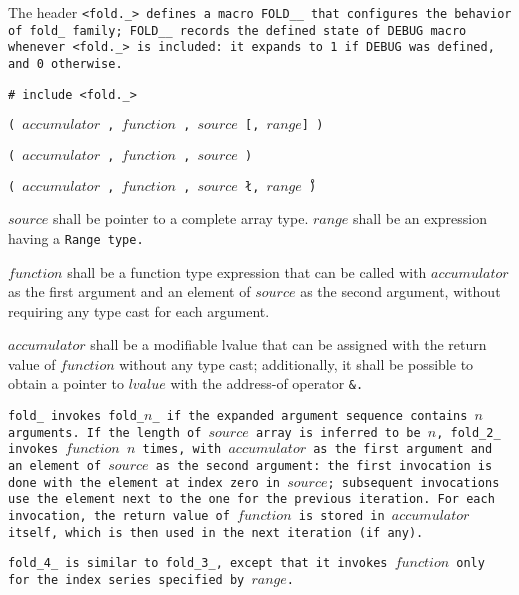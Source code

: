 The header \tt{<fold._>} defines a macro \tt{FOLD__} that configures
the behavior of \tt{fold_} family; \tt{FOLD__} records the \tt{defined}
state of \tt{DEBUG} macro whenever \tt{<fold._>} is included:
it expands to \tt{1} if \tt{DEBUG} was defined, and \tt{0} otherwise.


\tt{# include <fold._>}

\s\s\s\tt{(} $accumulator$ \tt{,}
$function$ \tt{,} $source$ [\tt{,} $range$] \tt{)}

\s\tt{(} $accumulator$ \tt{,}
$function$ \tt{,} $source$ \tt{)}

\s\tt{(} $accumulator$ \tt{,}
$function$ \tt{,} $source$ \l\tt{,} $range$\r\ \tt{)}


$source$ shall be pointer to a complete array type.
$range$  shall be an expression having a \tt{Range} type.

$function$ shall be a function type expression that can be called with
$accumulator$ as the first argument and an element of $source$ as the
second argument, without requiring any type cast for each argument.

$accumulator$ shall be a modifiable lvalue that can be assigned with the
return value of $function$ without any type cast; additionally, it shall be
possible to obtain a pointer to $lvalue$ with the address-of operator \tt{&}.

\enlargethispage*{\baselineskip}


\tt{fold_} invokes \tt{fold_}$n$\_ if the
expanded argument sequence contains $n$ arguments.
If the length of $source$ array is inferred to be $n$, \tt{fold_2_}
invokes $function$ $n$ times, with $accumulator$ as the first argument
and an element of $source$ as the second argument: the first invocation
is done with the element at index zero in $source$; subsequent
invocations use the element next to the one for the previous iteration.
For each invocation, the return value of $function$ is stored in
$accumulator$ itself, which is then used in the next iteration (if any).

\tt{fold_4_} is similar to \tt{fold_3_}, except that it invokes
$function$ only for the index series specified by $range$.

\enlargethispage*{\baselineskip}
\pagebreak
